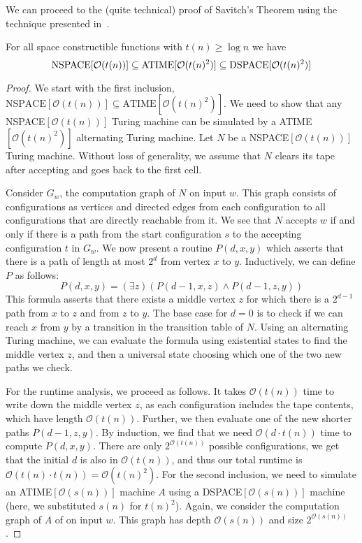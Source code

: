 We can proceed to the (quite technical) proof of Savitch's Theorem using the technique presented in~\cite{descriptive-complexity}.
\begin{theorem}
    For all space constructible functions with $t(n) \geq \log n$ we have
    \[
        \text{\upshape NSPACE}[\mathcal{O}(t(n))] \subseteq \text{\upshape ATIME}[\mathcal{O}(t(n)^2)] \subseteq \text{\upshape DSPACE}[\mathcal{O}(t(n)^2)]
    \]
\end{theorem}

\begin{proof}
    We start with the first inclusion, $\text{NSPACE$[\mathcal{O}(t(n))]$} \subseteq \text{ATIME$[\mathcal{O}(t(n)^2)]$}$.
    We need to show that any NSPACE$[\mathcal{O}(t(n))]$ Turing machine can be simulated by a ATIME$[\mathcal{O}(t(n)^2)]$ alternating Turing machine.
    Let $N$ be a NSPACE$[\mathcal{O}(t(n))]$ Turing machine.
    Without loss of generality, we assume that $N$ clears its tape after accepting and goes back to the first cell.

    Consider $G_w$, the computation graph of $N$ on input $w$.
    This graph consists of configurations as vertices and directed edges from each configuration to all configurations that are directly reachable from it.
    We see that $N$ accepts $w$ if and only if there is a path from the start configuration $s$ to the accepting configuration $t$ in $G_w$.
    We now present a routine $P(d, x, y)$ which asserts that there is a path of length at most $2^{d}$ from vertex $x$ to $y$.
    Inductively, we can define $P$ as follows:
    \[
        P(d, x, y) = (\exists z)(P(d - 1, x, z) \land P(d - 1, z, y))
    \]
    This formula asserts that there exists a middle vertex $z$ for which there is a $2^{d - 1}$ path from $x$ to $z$ and from $z$ to $y$.
    The base case for $d = 0$ is to check if we can reach $x$ from $y$ by a transition in the transition table of $N$.
    Using an alternating Turing machine, we can evaluate the formula using existential states to find the middle vertex $z$, and then a universal state choosing which one of the two new paths we check.

    For the runtime analysis, we proceed as follows.
    It takes $\mathcal{O}(t(n))$ time to write down the middle vertex $z$, as each configuration includes the tape contents, which have length $\mathcal{O}(t(n))$.
    Further, we then evaluate one of the new shorter paths $P(d - 1, z, y)$.
    By induction, we find that we need $\mathcal{O}(d\cdot t(n))$ time to compute $P(d, x, y)$.
    There are only $2^{\mathcal{O}(t(n))}$ possible configurations, we get that the initial $d$ is also in $\mathcal{O}(t(n))$, and thus our total runtime is $\mathcal{O}(t(n)\cdot t(n)) = \mathcal{O}(t(n)^2)$.
    \vspace{5mm}
    \sloppy For the second inclusion, we need to simulate an ATIME$[\mathcal{O}(s(n))]$ machine $A$ using a DSPACE$[\mathcal{O}(s(n))]$ machine (here, we substituted $s(n)$ for $t(n)^2$).
    Again, we consider the computation graph of $A$ of on input $w$.
    This graph has depth $\mathcal{O}(s(n))$ and size $2^{\mathcal{O}(s(n))}$.


\end{proof}

